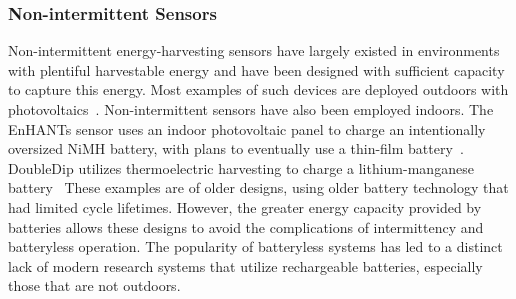 \subsubsection{Non-intermittent Sensors}
\label{sec:related:nonintermittent}
Non-intermittent energy-harvesting sensors
have largely existed in environments with plentiful harvestable energy
and have been designed with sufficient capacity to capture this energy. 
Most examples of such devices are deployed outdoors with photovoltaics~\cite{jiang2005perpetual, kansal2007power, corke2007long, lin2005heliomote, adkins2018signpost}. 
Non-intermittent sensors have also been employed indoors. 
The EnHANTs sensor uses an indoor photovoltaic panel to charge an intentionally oversized NiMH
battery, with plans to eventually use a thin-film battery~\cite{margolies2015energy}.
DoubleDip utilizes thermoelectric harvesting to charge a lithium-manganese battery~\cite{martin2012doubledip}
These examples are of older designs, using older battery technology that had limited cycle lifetimes. However, the greater energy capacity provided by batteries allows these designs to avoid the complications of intermittency and batteryless operation.
The popularity of batteryless systems has led to a distinct lack of modern research systems that utilize rechargeable batteries, especially those that are not outdoors.



